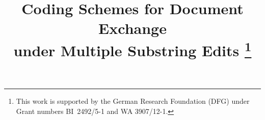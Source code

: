 \documentclass[onecolumn]{IEEEtran}
\begin{document}
\title{Coding Schemes for Document Exchange \\ under Multiple Substring Edits
\thanks{This work is supported by the German Research Foundation (DFG) under Grant numbers BI~2492/5-1 and WA 3907/12-1.}
}

\author{%
}


\end{document}
